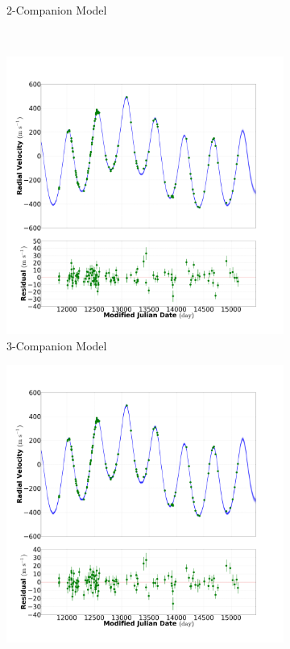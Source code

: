 \documentclass[letterpaper, preprint]{aastex}
\begin{document}
\begin{figure}
\begin{subfigure}[b]{0.49\textwidth}
		\caption{2-Companion Model}
	\end{subfigure}\\
	\begin{subfigure}[b]{0.49\textwidth}
		\includegraphics[width=\textwidth]{fit_res_282_mod_3_20130930.png}
		\caption{3-Companion Model}
	\end{subfigure}
	\begin{subfigure}[b]{0.49\textwidth}
		 \includegraphics[width=\textwidth]{fit_res_282_mod_4_20130930.png}

\end{subfigure}
\end{figure}
\end{document}
